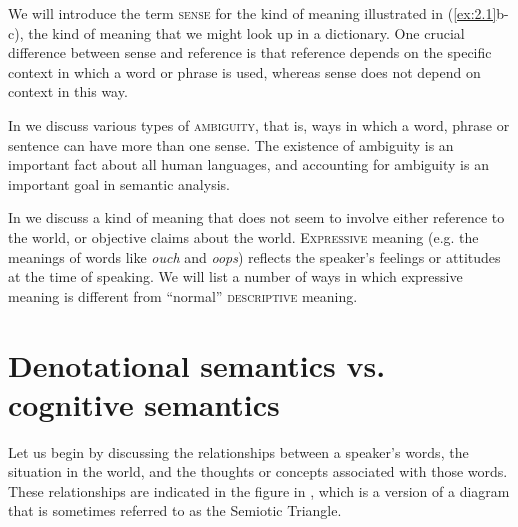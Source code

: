 We will introduce the term \textsc{sense} for the kind of meaning illustrated in (\ref{ex:2.1}b-c), the kind of meaning that we might look up in a dictionary. One crucial difference between sense and reference is that reference depends on the specific context in which a word or phrase is used, whereas sense does not depend on context in this way.



In  we discuss various types of \textsc{ambiguity}, that is, ways in which a word, phrase or sentence can have more than one sense. The existence of ambiguity is an important fact about all human languages, and accounting for ambiguity is an important goal in semantic analysis.



In  we discuss a kind of meaning that does not seem to involve either reference to the world, or objective claims about the world. \textsc{Expressive} meaning (e.g. the meanings of words like \textit{ouch} and \textit{oops}) reflects the speaker’s feelings or attitudes at the time of speaking. We will list a number of ways in which expressive meaning is different from “normal” \textsc{descriptive} meaning.


\section{Denotational semantics vs. cognitive semantics}\label{sec:2.2}

Let us begin by discussing the relationships between a speaker’s words, the situation in the world, and the thoughts or concepts associated with those words. These relationships are indicated in the figure in , which is a version of a diagram that is sometimes referred to as the Semiotic Triangle.



 



